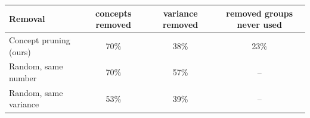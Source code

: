 \begin{tabular}{lccc}
\toprule
Removal & concepts removed & variance removed & removed groups never used \\
\midrule
Concept pruning (ours) & 70\% & 38\% & 23\% \\
Random, same number & 70\% & 57\% & -- \\
Random, same variance & 53\% & 39\% & -- \\
\bottomrule
\end{tabular}
